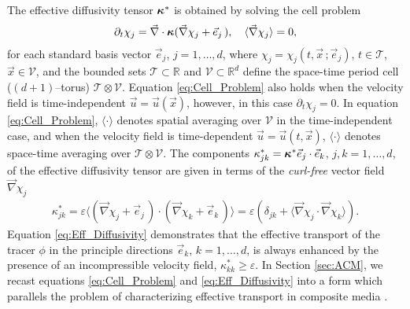 \documentclass[11pt]{amsart}
\newcommand{\Hb}{\mathbf{H}}
\newcommand{\Ib}{\mathbf{I}}
\newcommand{\Tc}{\mathcal{T}}
\newcommand{\Vc}{\mathcal{V}}
\newcommand\bkappa{\mbox{\boldmath${\kappa}$}}
\begin{document}
The effective diffusivity tensor $\bkappa^*$ is obtained by solving
the cell problem \cite{Fannjiang:SIAM_JAM:333}
% 
\begin{align}\label{eq:Cell_Problem}
  \partial_t\chi_j=\vec{\nabla}\cdot\bkappa(\vec{\nabla}\chi_j+\vec{e}_j\,), \quad
  \langle\vec{\nabla}\chi_j\rangle=0,
\end{align}
%
for each standard basis vector $\vec{e}_j$, $j=1,\ldots,d$, where
$\chi_j=\chi_j(t,\vec{x}\,;\vec{e}_j)$, $t\in\Tc$, $\vec{x}\in\Vc$, and the bounded
sets $\Tc\subset\mathbb{R}$ and $\Vc\subset\mathbb{R}^d$ define the space-time
period cell ($(d+1)$--torus) $\Tc\otimes\Vc$. Equation
\eqref{eq:Cell_Problem} also holds \cite{Fannjiang:SIAM_JAM:333} when
the velocity field is time-independent $\vec{u}=\vec{u}(\vec{x})$,
however, in this case $\partial_t\chi_j=0$. In equation \eqref{eq:Cell_Problem},
$\langle\cdot\rangle$ denotes spatial averaging over $\Vc$ in the time-independent
case, and when the velocity field is time-dependent
$\vec{u}=\vec{u}(t,\vec{x})$, $\langle\cdot\rangle$ denotes space-time averaging over
$\Tc\otimes\Vc$. The components $\kappa^*_{jk}=\bkappa^*\vec{e}_j\cdot\vec{e}_k$,
$j,k=1,\ldots,d$, of the effective diffusivity tensor are given in terms of
the \emph{curl-free} vector field $\vec{\nabla}\chi_j$
\cite{Fannjiang:SIAM_JAM:333}   
% 
\begin{align}\label{eq:Eff_Diffusivity}  
   \kappa^*_{jk}=\varepsilon\langle(\vec{\nabla}\chi_j+\vec{e}_j\,)\cdot(\vec{\nabla}\chi_k+\vec{e}_k\,)\rangle
       =\varepsilon(\delta_{jk}+\langle\vec{\nabla}\chi_j\cdot\vec{\nabla}\chi_k\rangle).
\end{align}
Equation \eqref{eq:Eff_Diffusivity} demonstrates that the effective
transport of the tracer $\phi$ in the principle directions $\vec{e}_k$,
$k=1,\ldots,d$, is always enhanced by the presence of an incompressible
velocity field, $\kappa^*_{kk}\geq\varepsilon$.
In Section \ref{sec:ACM},  we
recast equations \eqref{eq:Cell_Problem} and
\eqref{eq:Eff_Diffusivity} into a form which parallels the problem of
characterizing effective transport in composite media
\cite{Golden:CMP-473}. 
\end{document}
